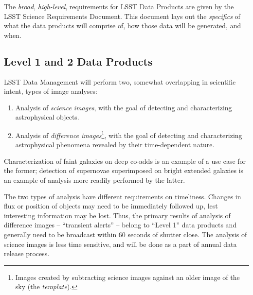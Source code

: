 \documentclass[12pt]{article}
\begin{document}
The {\em broad}, {\em high-level}, requirements for LSST Data Products are given by the LSST Science Requirements Document. This document lays out the {\em specifics} of what the data products will comprise of, how those data will be generated, and when.

\subsection{Level 1 and 2 Data Products}

LSST Data Management will perform two, somewhat overlapping in scientific intent, types of image analyses:

\begin{enumerate}
\item Analysis of {\em science images}, with the goal of detecting and characterizing astrophysical objects.
\item Analysis of {\em difference images}\footnote{Images created by subtracting science images against an older image of the sky (the {\em template}).}, with the goal of detecting and characterizing astrophysical phenomena revealed by their time-dependent nature.
\end{enumerate}

Characterization of faint galaxies on deep co-adds is an example of a use case for the former; detection of supernovae superimposed on bright extended galaxies is an example of analysis more readily performed by the latter.

The two types of analysis have different requirements on timeliness. Changes in flux or position of objects may need to be immediately followed up, lest interesting information may be lost. Thus, the primary results of analysis of difference images -- ``transient alerts'' -- belong to ``Level 1'' data products and generally need to be broadcast within 60 seconds of shutter close. The analysis of science images is less time sensitive, and will be done as a part of annual data release process.

\end{document}
